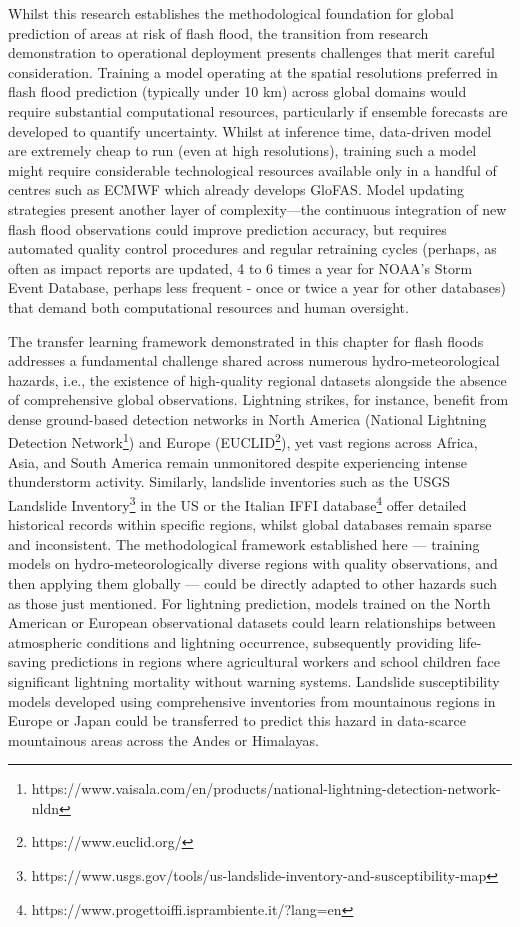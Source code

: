 Whilst  this research establishes the methodological foundation for global prediction of areas at risk of flash flood, the transition from research demonstration to operational deployment presents challenges that merit careful consideration. Training a model operating at the spatial resolutions preferred in flash flood prediction (typically under 10 km) across global domains would require substantial computational resources, particularly if ensemble forecasts are developed to quantify uncertainty. Whilst at inference time, data-driven model are extremely cheap to run (even at high resolutions), training such a model might require considerable technological resources available only in a handful of centres such as ECMWF which already develops GloFAS. Model updating strategies present another layer of complexity—the continuous integration of new flash flood observations could improve prediction accuracy, but requires automated quality control procedures and regular retraining cycles (perhaps, as often as impact reports are updated, 4 to 6 times a year for NOAA's Storm Event Database, perhaps less frequent - once or twice a year for other databases) that demand both computational resources and human oversight. 

The  transfer learning framework demonstrated in this chapter for flash floods addresses a fundamental challenge shared across numerous hydro-meteorological hazards, i.e., the existence of high-quality regional datasets alongside the absence of comprehensive global observations. Lightning strikes, for instance, benefit from dense ground-based detection networks in North America (National Lightning Detection Network\footnote{https://www.vaisala.com/en/products/national-lightning-detection-network-nldn}) and Europe (EUCLID\footnote{https://www.euclid.org/}), yet vast regions across Africa, Asia, and South America remain unmonitored despite experiencing intense thunderstorm activity. Similarly, landslide inventories such as the USGS Landslide Inventory\footnote{https://www.usgs.gov/tools/us-landslide-inventory-and-susceptibility-map} in the US or the Italian IFFI database\footnote{https://www.progettoiffi.isprambiente.it/?lang=en} offer detailed historical records within specific regions, whilst global databases remain sparse and inconsistent. The methodological framework established here — training models on hydro-meteorologically diverse regions with quality observations, and then applying them globally — could be directly adapted to other hazards such as those just mentioned. For lightning prediction, models trained on the North American or European observational datasets could learn relationships between atmospheric conditions and lightning occurrence, subsequently providing life-saving predictions in regions where agricultural workers and school children face significant lightning mortality without warning systems. Landslide susceptibility models developed using comprehensive inventories from mountainous regions in Europe or Japan could be transferred to predict this hazard in data-scarce mountainous areas across the Andes or Himalayas.

